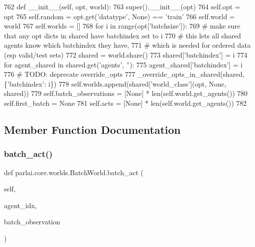 \begin{DoxyCode}
762     \textcolor{keyword}{def }\_\_init\_\_(self, opt, world):
763         super().\_\_init\_\_(opt)
764         self.opt = opt
765         self.random = opt.get(\textcolor{stringliteral}{'datatype'}, \textcolor{keywordtype}{None}) == \textcolor{stringliteral}{'train'}
766         self.world = world
767         self.worlds = []
768         \textcolor{keywordflow}{for} i \textcolor{keywordflow}{in} range(opt[\textcolor{stringliteral}{'batchsize'}]):
769             \textcolor{comment}{# make sure that any opt dicts in shared have batchindex set to i}
770             \textcolor{comment}{# this lets all shared agents know which batchindex they have,}
771             \textcolor{comment}{# which is needed for ordered data (esp valid/test sets)}
772             shared = world.share()
773             shared[\textcolor{stringliteral}{'batchindex'}] = i
774             \textcolor{keywordflow}{for} agent\_shared \textcolor{keywordflow}{in} shared.get(\textcolor{stringliteral}{'agents'}, \textcolor{stringliteral}{''}):
775                 agent\_shared[\textcolor{stringliteral}{'batchindex'}] = i
776             \textcolor{comment}{# TODO: deprecate override\_opts}
777             \_override\_opts\_in\_shared(shared, \{\textcolor{stringliteral}{'batchindex'}: i\})
778             self.worlds.append(shared[\textcolor{stringliteral}{'world\_class'}](opt, \textcolor{keywordtype}{None}, shared))
779         self.batch\_observations = [\textcolor{keywordtype}{None}] * len(self.world.get\_agents())
780         self.first\_batch = \textcolor{keywordtype}{None}
781         self.acts = [\textcolor{keywordtype}{None}] * len(self.world.get\_agents())
782 
\end{DoxyCode}


\subsection{Member Function Documentation}
\mbox{\label{classparlai_1_1core_1_1worlds_1_1BatchWorld_a0bf69fe51e7eb0f8ba2fc3748c8c9181}} 
\subsubsection{\texorpdfstring{batch\+\_\+act()}{batch\_act()}}
{\footnotesize\ttfamily def parlai.\+core.\+worlds.\+Batch\+World.\+batch\+\_\+act (\begin{DoxyParamCaption}\item[{}]{self,  }\item[{}]{agent\+\_\+idx,  }\item[{}]{batch\+\_\+observation }\end{DoxyParamCaption})}

